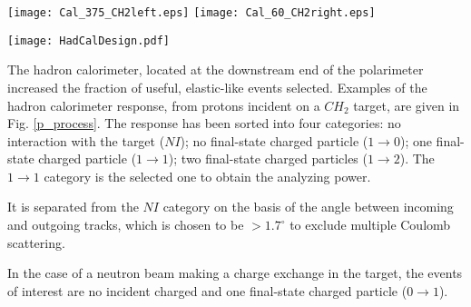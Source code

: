 \documentclass[epj]{svjour}
\begin{document}
\begin{figure*}
\centering
\texttt{[image: Cal\_375\_CH2left.eps]}
\texttt{[image: Cal\_60\_CH2right.eps]}
\hspace*{-0.1cm}
\caption{Summed calorimeter energy deposit for different processes induced on a $CH_2$ target by protons of  momentum 3.75 GeV/c (left) and 6.0 GeV/c (right).}
\label{p_process}
\end{figure*}

\begin{figure*}
\centering
\texttt{[image: HadCalDesign.pdf]}
\caption{View of the different bars of the hadron calorimeter used in the ALPOM2 set up. The different bar compositions are noted at the side.}
\label{fig:HadCalDesign}
\end{figure*}

The hadron calorimeter, located at the downstream end of the polarimeter increased the fraction of useful, elastic-like events selected. Examples of the hadron calorimeter response, from protons incident on a $CH_2$ target,  are given in Fig. \ref{p_process}. The response has been sorted into four categories: no interaction with the target ($NI$); no final-state charged particle ($1 \to 0$); one final-state charged particle ($1 \to 1$); two final-state charged particles  ($1 \to 2$). The  $1 \to 1$ category is the selected one to obtain the analyzing power.

It is separated from the $NI$ category on the basis of the angle between incoming and outgoing tracks, which is chosen to be $>1.7^\circ$ to exclude multiple Coulomb scattering.

In the case of a neutron beam making a charge exchange in the target, the events of interest are no incident charged and one final-state charged particle ($0 \to 1$).
\end{document}
